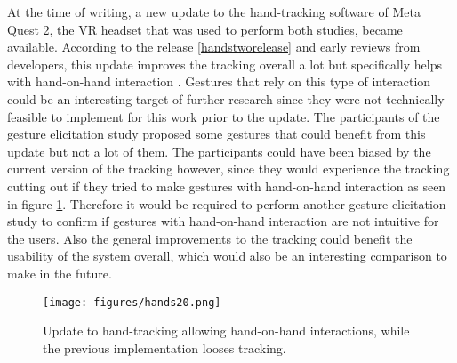 At the time of writing, a new update to the hand-tracking software of Meta Quest 2, the VR headset that was used to perform both studies, became available. According to the release  \ref{handstworelease} and early reviews from developers, this update improves the tracking overall a lot but specifically helps with hand-on-hand interaction \cite{handstwoupdate}. Gestures that rely on this type of interaction could be an interesting target of further research since they were not technically feasible to implement for this work prior to the update. The participants of the gesture elicitation study proposed some gestures that could benefit from this update but not a lot of them. The participants could have been biased  by the current version of the tracking however, since they would experience the tracking cutting out if they tried to make gestures with hand-on-hand interaction as seen in figure \ref{fig:hands20}. Therefore it would be required to perform another gesture elicitation study to confirm if gestures with hand-on-hand interaction are not intuitive for the users. Also the general improvements to the tracking could benefit the usability of the system overall, which would also be an interesting comparison to make in the future. 

\begin{figure}[!ht]
    \centering
    \texttt{[image: figures/hands20.png]}
    \caption{Update to hand-tracking allowing hand-on-hand interactions, while the previous implementation looses tracking.}
    \label{fig:hands20}
\end{figure}


